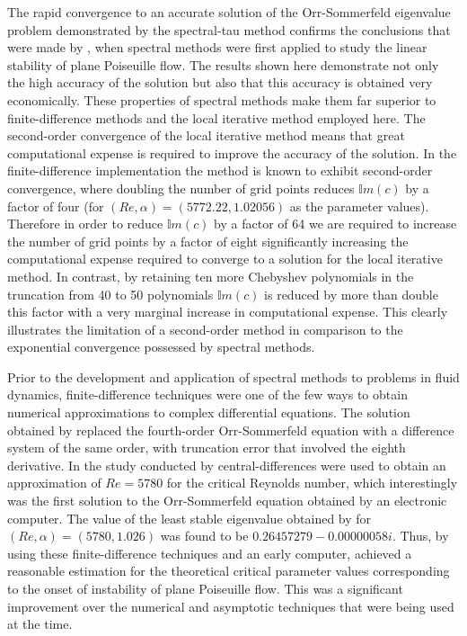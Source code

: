 \documentclass[a4paper, 12pt, twoside, openright]{article}
\numberwithin{equation}{section}
\begin{document}
The rapid convergence to an accurate solution of the Orr-Sommerfeld eigenvalue problem demonstrated by the spectral-tau method confirms the conclusions that were made by \cite{Orszag71}, when spectral methods were first applied to study the linear stability of plane Poiseuille flow. The results shown here demonstrate not only the high accuracy of the solution but also that this accuracy is obtained very economically. These properties of spectral methods make them far superior to finite-difference methods and the local iterative method employed here. The second-order convergence of the local iterative method means that great computational expense is required to improve the accuracy of the solution. In the finite-difference implementation the method is known to exhibit second-order convergence, where doubling the number of grid points reduces $\mathbb{I}m(c)$ by a factor of four (for $(Re,\alpha)=(5772.22,1.02056)$ as the parameter values). Therefore in order to reduce $\mathbb{I}m(c)$ by a factor of 64 we are required to increase the number of grid points by a factor of eight significantly increasing the computational expense required to converge to a solution for the local iterative method. In contrast, by retaining ten more Chebyshev polynomials in the truncation from 40 to 50 polynomials $\mathbb{I}m(c)$ is reduced by more than double this factor with a very marginal increase in computational expense. This clearly illustrates the limitation of a second-order method in comparison to the exponential convergence possessed by spectral methods.%

Prior to the development and application of spectral methods to problems in fluid dynamics, finite-difference techniques were one of the few ways to obtain numerical approximations to complex differential equations. The solution obtained by \cite{Thomas53} replaced the fourth-order Orr-Sommerfeld equation with a difference system of the same order, with truncation error that involved the eighth derivative. In the study conducted by \cite{Thomas53} central-differences were used to obtain an approximation of $Re=5780$ for the critical Reynolds number, which interestingly was the first solution to the Orr-Sommerfeld equation obtained by an electronic computer. The value of the least stable eigenvalue obtained by \cite{Thomas53} for $(Re,\alpha)=(5780,1.026)$ was found to be $0.26457279 - 0.00000058i$. Thus, by using these finite-difference techniques and an early computer, \cite{Thomas53} achieved a reasonable estimation for the theoretical critical parameter values corresponding to the onset of instability of plane Poiseuille flow. This was a significant improvement over the numerical and asymptotic techniques that were being used at the time.%
\end{document}
